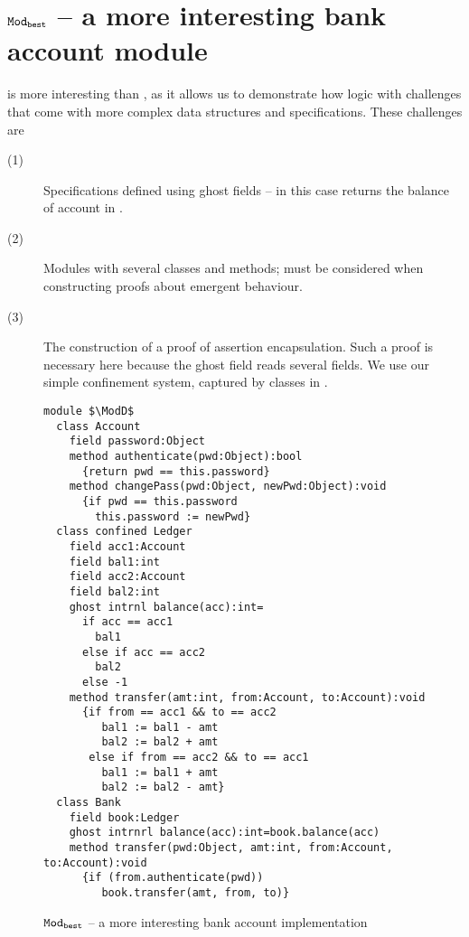 \newpage
\section{ ${\texttt{Mod}}_{{\texttt{best}}}$  -- a more interesting bank account module}

\label{app:BankAccount}

\ModD  is more interesting than \ModC, as it allows us  to demonstrate how   \Nec logic 
 with  challenges that come with more complex data structures and specifications.
These challenges are 
\begin{description}
\item[(1)] Specifications defined using ghost fields -- in this case  returns the balance of account  in  .
\item[(2)] Modules with several    classes and methods;  must be considered when constructing proofs about emergent behaviour.
\item[(3)]  The construction of a proof of assertion encapsulation. Such a proof is necessary  here because
 the ghost field  reads several  fields. We use our 
 simple confinement system,  captured by \enclosed classes in \Loo.
\end{description}


\begin{figure}[t]
\begin{lstlisting}[mathescape=true, frame=lines]
module $\ModD$
  class Account
    field password:Object
    method authenticate(pwd:Object):bool
      {return pwd == this.password}
    method changePass(pwd:Object, newPwd:Object):void
      {if pwd == this.password
        this.password := newPwd}
  class confined Ledger
    field acc1:Account
    field bal1:int
    field acc2:Account
    field bal2:int
    ghost intrnl balance(acc):int=
      if acc == acc1
        bal1
      else if acc == acc2
        bal2
      else -1
    method transfer(amt:int, from:Account, to:Account):void
      {if from == acc1 && to == acc2
         bal1 := bal1 - amt
         bal2 := bal2 + amt
       else if from == acc2 && to == acc1
         bal1 := bal1 + amt
         bal2 := bal2 - amt}
  class Bank
    field book:Ledger
    ghost intrnrl balance(acc):int=book.balance(acc)
    method transfer(pwd:Object, amt:int, from:Account, to:Account):void
      {if (from.authenticate(pwd))
         book.transfer(amt, from, to)}
\end{lstlisting}
\caption{${\texttt{Mod}}_{{\texttt{best}}}$ -- a more interesting bank account implementation}
\label{f:ex-bank-short}
\end{figure}
 
